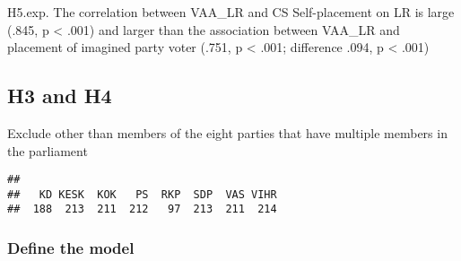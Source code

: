 \documentclass[
]{article}
\newenvironment{Shaded}{\begin{snugshade}}{\end{snugshade}}
\newcommand{\KeywordTok}[1]{\textcolor[rgb]{0.13,0.29,0.53}{\textbf{#1}}}
\newcommand{\NormalTok}[1]{#1}
\newcommand{\OperatorTok}[1]{\textcolor[rgb]{0.81,0.36,0.00}{\textbf{#1}}}
\newcommand{\StringTok}[1]{\textcolor[rgb]{0.31,0.60,0.02}{#1}}
\begin{document}
H5.exp. The correlation between VAA\_LR and CS Self-placement on LR is
large (.845, p \textless{} .001) and larger than the association between
VAA\_LR and placement of imagined party voter (.751, p \textless{} .001;
difference .094, p \textless{} .001)

\newpage

\hypertarget{h3-and-h4}{%
\subsection{H3 and H4}\label{h3-and-h4}}

Exclude other than members of the eight parties that have multiple
members in the parliament

\begin{Shaded}
\end{Shaded}

\begin{verbatim}
## 
##   KD KESK  KOK   PS  RKP  SDP  VAS VIHR 
##  188  213  211  212   97  213  211  214
\end{verbatim}

\hypertarget{define-the-model-1}{%
\subsubsection{Define the model}\label{define-the-model-1}}
\end{document}
